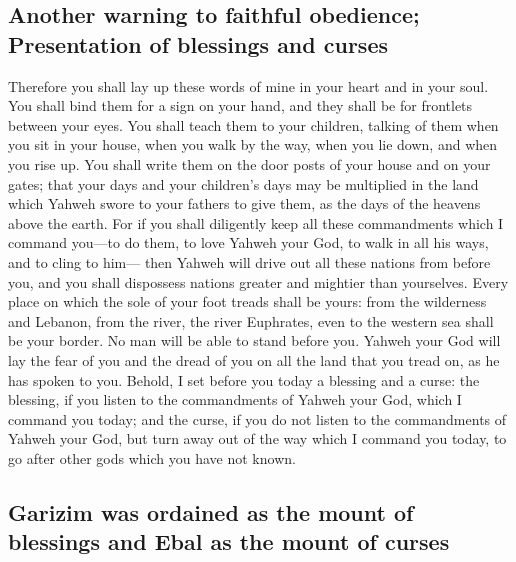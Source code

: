 \hypertarget{another-warning-to-faithful-obedience-presentation-of-blessings-and-curses}{%
\subsection{Another warning to faithful obedience; Presentation of
blessings and
curses}\label{another-warning-to-faithful-obedience-presentation-of-blessings-and-curses}}

 Therefore you shall lay up these words of mine in your
heart and in your soul. You shall bind them for a sign on your hand, and
they shall be for frontlets between your eyes.  You shall
teach them to your children, talking of them when you sit in your house,
when you walk by the way, when you lie down, and when you rise up.
 You shall write them on the door posts of your house and
on your gates;  that your days and your children's days
may be multiplied in the land which Yahweh swore to your fathers to give
them, as the days of the heavens above the earth.  For if
you shall diligently keep all these commandments which I command
you---to do them, to love Yahweh your God, to walk in all his ways, and
to cling to him---  then Yahweh will drive out all these
nations from before you, and you shall dispossess nations greater and
mightier than yourselves.  Every place on which the sole
of your foot treads shall be yours: from the wilderness and Lebanon,
from the river, the river Euphrates, even to the western sea shall be
your border.  No man will be able to stand before you.
Yahweh your God will lay the fear of you and the dread of you on all the
land that you tread on, as he has spoken to you.  Behold,
I set before you today a blessing and a curse:  the
blessing, if you listen to the commandments of Yahweh your God, which I
command you today;  and the curse, if you do not listen
to the commandments of Yahweh your God, but turn away out of the way
which I command you today, to go after other gods which you have not
known.

\hypertarget{garizim-was-ordained-as-the-mount-of-blessings-and-ebal-as-the-mount-of-curses}{%
\subsection{Garizim was ordained as the mount of blessings and Ebal as
the mount of
curses}\label{garizim-was-ordained-as-the-mount-of-blessings-and-ebal-as-the-mount-of-curses}}

